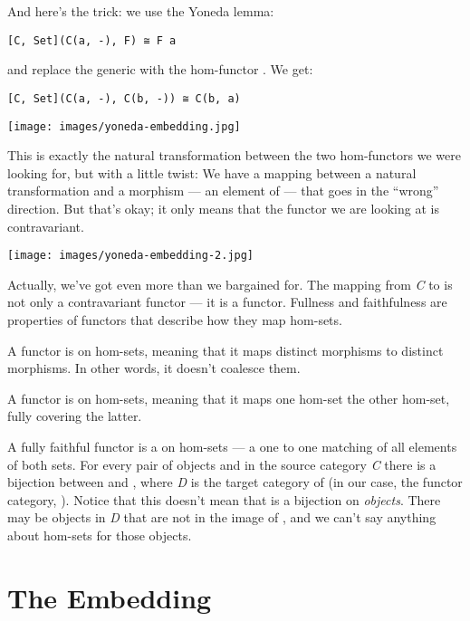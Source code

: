 And here's the trick: we use the Yoneda lemma:

\begin{verbatim}
[C, Set](C(a, -), F) ≅ F a
\end{verbatim}

and replace the generic  with the hom-functor
. We get:

\begin{verbatim}
[C, Set](C(a, -), C(b, -)) ≅ C(b, a)
\end{verbatim}

\texttt{[image: images/yoneda-embedding.jpg]}

This is exactly the natural transformation between the two hom-functors
we were looking for, but with a little twist: We have a mapping between
a natural transformation and a morphism --- an element of
 --- that goes in the ``wrong'' direction. But that's
okay; it only means that the functor we are looking at is contravariant.

\texttt{[image: images/yoneda-embedding-2.jpg]}

Actually, we've got even more than we bargained for. The mapping from
\emph{C} to \code{{[}C,\ Set{]}} is not only a contravariant functor
--- it is a  functor. Fullness and faithfulness are
properties of functors that describe how they map hom-sets.

A  functor is  on hom-sets, meaning that
it maps distinct morphisms to distinct morphisms. In other words, it
doesn't coalesce them.

A  functor is  on hom-sets, meaning that it
maps one hom-set  the other hom-set, fully covering the
latter.

A fully faithful functor  is a  on hom-sets
--- a one to one matching of all elements of both sets. For every pair
of objects  and  in the source category \emph{C}
there is a bijection between  and
, where \emph{D} is the target category of
 (in our case, the functor category, \code{{[}C,\ Set{]}}).
Notice that this doesn't mean that  is a bijection on
\emph{objects}. There may be objects in \emph{D} that are not in the
image of , and we can't say anything about hom-sets for those
objects.

\section{The Embedding}\label{the-embedding}


